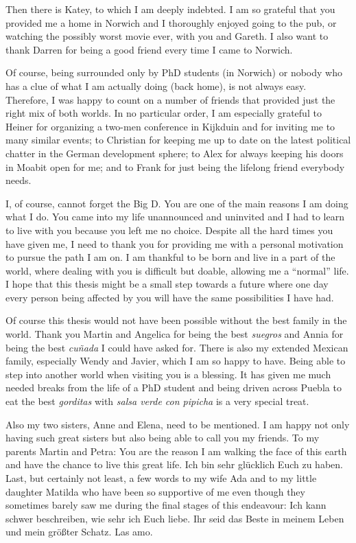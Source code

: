 Then there is Katey, to which I am deeply indebted. I am so grateful that you provided me a home in Norwich and I thoroughly enjoyed going to the pub, or watching the possibly worst movie ever, with you and Gareth. I also want to thank Darren for being a good friend every time I came to Norwich. 

Of course, being surrounded only by PhD students (in Norwich) or nobody who has a clue of what I am actually doing (back home), is not always easy. Therefore, I was happy to count on a number of friends that provided just the right mix of both worlds. In no particular order, I am especially grateful to Heiner for organizing a two-men conference in Kijkduin and for inviting me to many similar events; to Christian for keeping me up to date on the latest political chatter in the German development sphere; to Alex for always keeping his doors in Moabit open for me; and to Frank for just being the lifelong friend everybody needs.

I, of course, cannot forget the Big D. You are one of the main reasons I am doing what I do. You came into my life unannounced and uninvited and I had to learn to live with you because you left me no choice. Despite all the hard times you have given me, I need to thank you for providing me with a personal motivation to pursue the path I am on. I am thankful to be born and live in a part of the world, where dealing with you is difficult but doable, allowing me a ``normal'' life. I hope that this thesis might be a small step towards a future where one day every person being affected by you will have the same possibilities I have had.

Of course this thesis would not have been possible without the best family in the world. Thank you Martin and Angelica for being the best \textit{suegros} and Annia for being the best \textit{cu\~{n}ada} I could have asked for. There is also my extended Mexican family, especially Wendy and Javier, which I am so happy to have. Being able to step into another world when visiting you is a blessing. It has given me much needed breaks from the life of a PhD student and being driven across Puebla to eat the best \textit{gorditas} with \textit{salsa verde con pipicha} is a very special treat. 

Also my two sisters, Anne and Elena, need to be mentioned. I am happy not only having such great sisters but also being able to call you my friends. 
To my parents Martin and Petra: You are the reason I am walking the face of this earth and have the chance to live this great life. Ich bin sehr glücklich Euch zu haben. Last, but certainly not least, a few words to my wife Ada and to my little daughter Matilda who have been so supportive of me even though they sometimes barely saw me during the final stages of this endeavour: Ich kann schwer beschreiben, wie sehr ich Euch liebe. Ihr seid das Beste in meinem Leben und mein größter Schatz. Las amo.

